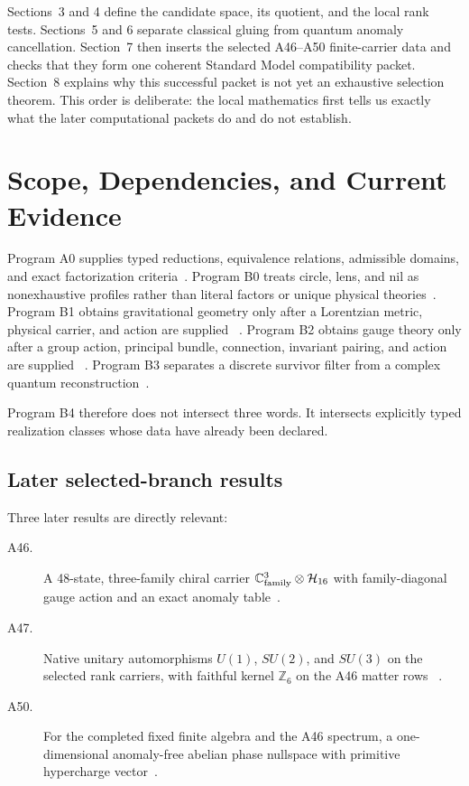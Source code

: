 \documentclass[11pt]{article}
\newcommand{\Hilbert}{\mathcal H}
\begin{document}
Sections~3 and 4 define the candidate space, its quotient, and the local rank
tests.  Sections~5 and 6 separate classical gluing from quantum anomaly
cancellation.  Section~7 then inserts the selected A46--A50 finite-carrier
data and checks that they form one coherent Standard Model compatibility
packet.  Section~8 explains why this successful packet is not yet an
exhaustive selection theorem.  This order is deliberate: the local
mathematics first tells us exactly what the later computational packets do and
do not establish.

\section{Scope, Dependencies, and Current Evidence}

Program A0 supplies typed reductions, equivalence relations, admissible
domains, and exact factorization criteria~\cite{A0}.  Program B0 treats circle,
lens, and nil as nonexhaustive profiles rather than literal factors or unique
physical theories~\cite{B0}.  Program B1 obtains gravitational geometry only
after a Lorentzian metric, physical carrier, and action are supplied
~\cite{B1}.  Program B2 obtains gauge theory only after a group action,
principal bundle, connection, invariant pairing, and action are supplied
~\cite{B2}.  Program B3 separates a discrete survivor filter from a complex
quantum reconstruction~\cite{B3}.

Program B4 therefore does not intersect three words.  It intersects explicitly
typed realization classes whose data have already been declared.

\subsection{Later selected-branch results}

Three later results are directly relevant:
\begin{description}
\item[A46.]
A 48-state, three-family chiral carrier
$\mathbb C^3_{\rm family}\otimes\Hilbert_{16}$ with family-diagonal gauge
action and an exact anomaly table~\cite{A46Packet}.

\item[A47.]
Native unitary automorphisms $U(1)$, $SU(2)$, and $SU(3)$ on the selected
rank carriers, with faithful kernel $\mathbb Z_6$ on the A46 matter rows
~\cite{A47Packet}.

\item[A50.]
For the completed fixed finite algebra and the A46 spectrum, a
one-dimensional anomaly-free abelian phase nullspace with primitive
hypercharge vector~\cite{A50Packet}.
\end{description}
\end{document}
